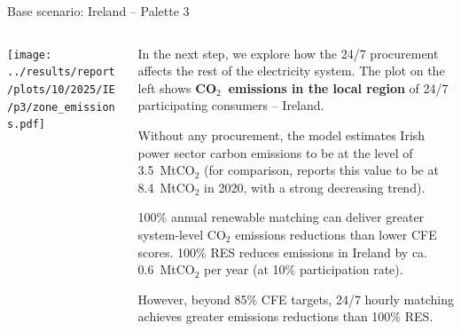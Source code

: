 \begin{frame}{Base scenario: Ireland -- Palette 3}

  {\footnotesize
  \vspace{0.1cm}
  
  \begin{columns}[T]
  \begin{column}{9cm}
  \centering
  
  \texttt{[image: ../results/report/plots/10/2025/IE/p3/zone\_emissions.pdf]}
  
  \end{column}
  \begin{column}{6cm}
  
  \vspace{0.1cm}
  In the next step, we explore how the 24/7 procurement affects the 
  rest of the electricity system. The plot on the left shows
  {\bf CO$_2$~emissions in the local region} of 24/7 participating 
  consumers -- Ireland.
  
  \vspace{0.1cm}
  Without any procurement, the model estimates 
  Irish power sector carbon emissions to be at the level of 3.5~MtCO$_2$
  (for comparison, 
  reports this value to be at 8.4~MtCO$_2$ in 2020, with a strong decreasing trend).

  \vspace{0.1cm}
  100\% annual renewable matching can deliver greater system-level CO$_2$ emissions
  reductions than lower CFE scores. 100\% RES reduces emissions in Ireland by 
  ca. 0.6~MtCO$_2$ per year (at 10\% participation rate).
  
  \vspace{0.1cm}
  However, beyond 85\% CFE targets, 24/7 hourly matching achieves
  \alert{greater emissions reductions} than 100\% RES.

  \end{column}
  \end{columns}
  }
\end{frame}


